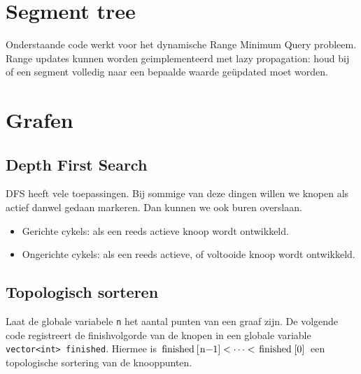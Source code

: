 \documentclass[10pt,a4paper,titlepage]{article}
\begin{document}

\section{Segment tree}
Onderstaande code werkt voor het dynamische Range Minimum Query probleem. Range updates kunnen worden geimplementeerd met lazy propagation: houd bij of een segment volledig naar een bepaalde waarde ge\"updated moet worden.



\section{Grafen}

\subsection{Depth First Search}

DFS heeft vele toepassingen. Bij sommige van deze dingen willen we knopen als actief danwel gedaan markeren. Dan kunnen we ook buren overslaan.
\begin{itemize}[noitemsep,nolistsep]
\item Gerichte cykels: als een reeds actieve knoop wordt ontwikkeld.
\item Ongerichte cykels: als een reeds actieve, of voltooide knoop wordt ontwikkeld.
\end{itemize}

\subsection{Topologisch sorteren}

Laat de globale variabele \texttt{n} het aantal punten van een graaf zijn.
De volgende code registreert de finishvolgorde van de knopen in een globale variable \lstinline{vector<int> finished}. Hiermee is $\text{\lstinline{finished[n-1]}} < \cdots < \text{\lstinline{finished[0]}}$ een topologische sortering van de knooppunten.
\end{document}
